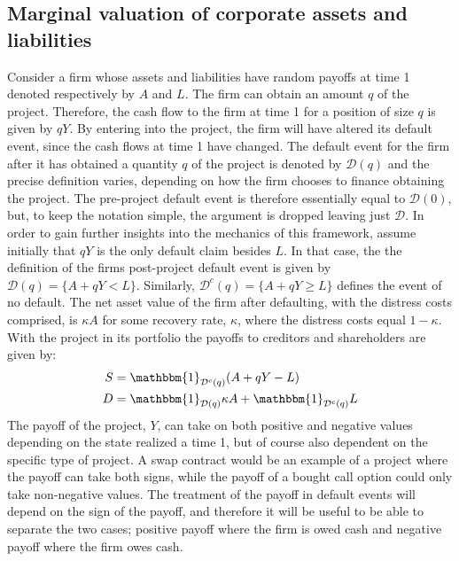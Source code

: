 \documentclass[../main.tex]{subfiles}
\begin{document}
    \subsection{Marginal valuation of corporate assets and liabilities}
        Consider a firm whose assets and liabilities have random payoffs at time 1 denoted respectively by $A$ and $L$.  
        The firm can obtain an amount $q$ of the project.
        Therefore, the cash flow to the firm at time 1 for a position of size $q$ is given by $qY$.
        By entering into the project, the firm will have altered its default event,
        since the cash flows at time 1 have changed.
        The default event for the firm after it has obtained a quantity $q$ of the project
        is denoted by $\mathcal{D}(q)$ and the precise definition varies,
        depending on how the firm chooses to finance obtaining the project.
        The pre-project default event is therefore essentially equal to $\mathcal{D}(0)$,
        but, to keep the notation simple, the argument is dropped leaving just $\mathcal{D}$.
        In order to gain further insights into the mechanics of this framework, 
        assume initially that $qY$ is the only default claim besides $L$. 
        In that case, the the definition of the firms post-project default event is given by 
        $\mathcal{D}(q) = \{A + qY < L\}$.
        Similarly, $\mathcal{D}^{c}(q) = \{A + qY \geq L\}$ defines the event of no default.
        The net asset value of the firm after defaulting, with the distress costs comprised, is $\kappa A$ for some recovery rate, $\kappa$, where the distress costs equal $1-\kappa$.
        With the project in its portfolio the payoffs to creditors and shareholders are given by:
            \begin{align}
                S 
                &= 
                \mathbbm{1}_{\mathcal{D}^{c}(q)}
                (A + qY - L)
                \\
                D 
                &= 
                \mathbbm{1}_{\mathcal{D}(q)}
                \kappa A 
                + 
                \mathbbm{1}_{\mathcal{D}^{c}(q)} 
                L
            \end{align}
        The payoff of the project, $Y$, can take on both positive and negative values
        depending on the state realized a time 1, 
        but of course also dependent on the specific type of project. 
        A swap contract would be an example of a project where the payoff can take both signs,
        while the payoff of a bought call option could only take non-negative values.
        The treatment of the payoff in default events will depend on the sign of the payoff,
        and therefore it will be useful to be able to separate the two cases;
        positive payoff where the firm is owed cash
        and negative payoff where the firm owes cash.
\end{document}

